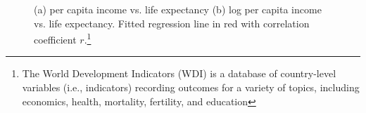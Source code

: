 \documentclass[10pt]{beamer}\usepackage[]{graphicx}\usepackage[]{color}
\newenvironment{knitrout}{}{} %
\begin{document}
\begin{frame}
	
\begin{knitrout}\tiny
{}\color{fgcolor}\begin{figure}

{\centering {}

}

\caption{(a) per capita income vs. life expectancy (b) log per capita income vs. life expectancy. Fitted regression line in red with correlation coefficient $r$.\footnote{\tiny{The World Development Indicators (WDI) is a database of country-level variables (i.e., indicators) recording outcomes for a variety of topics, including economics, health, mortality, fertility, and education}}}\label{fig:004-nyt}
\end{figure}


\end{knitrout}
	
\end{frame}
\end{document}
